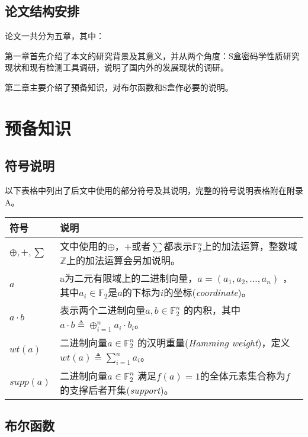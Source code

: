 \documentclass{xduugthesis}
\begin{document}
\section{论文结构安排}
论文一共分为五章，其中：\par
第一章首先介绍了本文的研究背景及其意义，并从两个角度：S盒密码学性质研究现状和现有检测工具调研，说明了国内外的发展现状的调研。\par
第二章主要介绍了预备知识，对布尔函数和S盒作必要的说明。

\chapter{预备知识}
\section{符号说明}
以下表格中列出了后文中使用的部分符号及其说明，完整的符号说明表格附在附录A。\par
\begin{tabular}{|p{3cm}|p{11cm}|}
\hline
符号& 说明\\
\hline
$\oplus,+,\sum $ & 文中使用的$\oplus$，$+$或者$\sum$都表示$\mathbb{F}_2^n$上的加法运算，整数域$\mathbb{Z}$上的加法运算会另加说明。\\
\hline
$a$ & a为二元有限域上的二进制向量，$a=(a_1,a_2,\dots ,a_n)$ ，其中$a_i \in \mathbb{F}_2$是$a$的下标为$i$的坐标(\emph{coordinate})。\\
\hline
$a \cdot b$ & 表示两个二进制向量$a,b \in \mathbb{F}_2^n$ 的内积，其中$a \cdot b \triangleq \oplus _{i=1}^n a_i \cdot b_i$。\\
\hline
$wt(a)$ & 二进制向量$a \in \mathbb{F}_2^n$ 的汉明重量(\emph{Hamming weight})，定义$wt(a)\triangleq \sum_{i=1}^n a_i $。\\
\hline
$supp(a)$ & 二进制向量$a\in \mathbb{F}_2^n$ 满足$f(a)=1$的全体元素集合称为$f$的支撑后者开集(\emph{support})。\\
\hline
\end{tabular}\par

\section{布尔函数}
\end{document}
